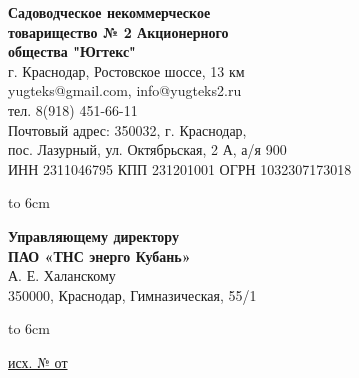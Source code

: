 \noindent\parbox[l][71mm]{80mm}
{
	 \begin{center}
 {\small \textbf{Садоводческое некоммерческое\\ товарищество
 	№  2 Акционерного\\ общества "Югтекс"\\
 }}
 \footnotesize{г. Краснодар, Ростовское шоссе, 13 км\\
 	yugteks@gmail.com, info@yugteks2.ru\\
 	тел. 8(918) 451-66-11\\
 	Почтовый адрес: 350032, г. Краснодар,\\ пос. Лазурный, ул. Октябрьская, 2 А, а/я   900
  }\\
 {ИНН 2311046795 КПП 231201001 ОГРН 1032307173018}
		\end{center}
\hbox to 6cm{ }}\hfill
\parbox[l][71mm]{65mm}
{ \begin{center}
	\small{
	\textbf{Управляющему директору\\ ПАО «ТНС энерго Кубань»}\\
	\vspace{3mm}
	А. Е. Халанскому\\
	\vspace{3mm}
 {\footnotesize 350000, Краснодар, Гимназическая, 55/1}

	}
\end{center}
\hbox to 6cm{ }}
\linebreak
\vspace{-12mm}

\underline{исх. №  от } 